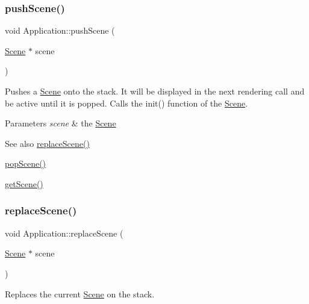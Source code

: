 \subsubsection{\texorpdfstring{pushScene()}{pushScene()}}
{\footnotesize\ttfamily void Application\+::push\+Scene (\begin{DoxyParamCaption}\item[{\mbox{\hyperlink{classsage_1_1Scene}{Scene}} $\ast$}]{scene }\end{DoxyParamCaption})}



Pushes a \mbox{\hyperlink{classsage_1_1Scene}{Scene}} onto the stack. It will be displayed in the next rendering call and be active until it is popped. Calls the init() function of the \mbox{\hyperlink{classsage_1_1Scene}{Scene}}. 


\begin{DoxyParams}{Parameters}
{\em scene} & the \mbox{\hyperlink{classsage_1_1Scene}{Scene}} \\
\hline
\end{DoxyParams}
\begin{DoxySeeAlso}{See also}
\mbox{\hyperlink{classsage_1_1Application_a49f5ce7574cf4f3053c4213d3177c76c}{replace\+Scene()}} 

\mbox{\hyperlink{classsage_1_1Application_a47b5bec61b3d93cbb4998b42d0d2ea47}{pop\+Scene()}} 

\mbox{\hyperlink{classsage_1_1Application_a4eaac489d4247bd184e17fa0aa6c858c}{get\+Scene()}} 
\end{DoxySeeAlso}
\mbox{\label{classsage_1_1Application_a49f5ce7574cf4f3053c4213d3177c76c}} 
\subsubsection{\texorpdfstring{replaceScene()}{replaceScene()}}
{\footnotesize\ttfamily void Application\+::replace\+Scene (\begin{DoxyParamCaption}\item[{\mbox{\hyperlink{classsage_1_1Scene}{Scene}} $\ast$}]{scene }\end{DoxyParamCaption})}



Replaces the current \mbox{\hyperlink{classsage_1_1Scene}{Scene}} on the stack. 


